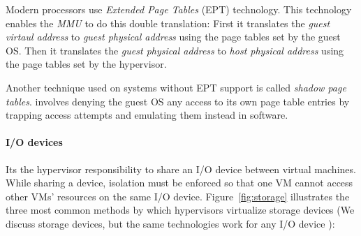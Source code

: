 Modern processors use \emph{Extended Page Tables} (EPT) technology. This technology enables the \emph{MMU} to do this double translation: First it translates the \emph{guest virtaul address} to \emph{guest physical address} using the page tables set by the guest OS. Then it translates the \emph{guest physical address} to \emph{host physical address} using the page tables set by the hypervisor.

Another technique used on systems without EPT support is called \emph{shadow page tables}.
involves denying the guest OS any access to its own page table entries by trapping access attempts and emulating them instead in software.

\paragraph {I/O devices}
Its the hypervisor responsibility to share an I/O device between virtual machines. While sharing a device, isolation must be enforced so that one VM cannot access other VMs' resources on the same I/O device.
Figure~\ref{fig:storage} illustrates the three most common methods by which hypervisors virtualize storage devices (We discuss storage devices, but the same technologies work for any I/O device ):

